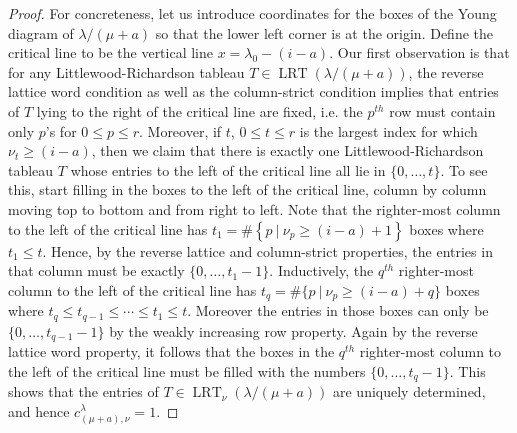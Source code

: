 \documentclass[unnumsec,webpdf,modern,medium]{oup-authoring-template}
\theoremstyle{theorem}
\theoremstyle{definition}
\begin{document}
\begin{proof}
	For concreteness, let us introduce coordinates for the boxes of the Young diagram of $\lambda/(\mu+a)$ so that the lower left corner is at the origin.  Define the critical line to be the vertical line $x=\lambda_0-(i-a)$.  Our first observation is that for any Littlewood-Richardson tableau $T\in\operatorname{LRT}(\lambda/(\mu+a))$, the reverse lattice word condition as well as the column-strict condition implies that entries of $T$ lying to the right of the critical line are fixed, i.e. the $p^{th}$ row must contain only $p$'s for $0\leq p\leq r$.  Moreover, if $t$, $0\leq t\leq r$ is the largest index for which $\nu_t\geq (i-a)$, then we claim that there is exactly one Littlewood-Richardson tableau $T$ whose entries to the left of the critical line all lie in $\{0,\ldots,t\}$.  To see this, start filling in the boxes to the left of the critical line, column by column moving top to bottom and from right to left.  Note that the righter-most column to the left of the critical line has $t_1=\#\left\{p \ | \ \nu_p\geq (i-a)+1\right\}$ boxes where $t_1\leq t$.  Hence, by the reverse lattice and column-strict properties, the entries in that column must be exactly $\{0,\ldots,t_1-1\}$.  Inductively, the $q^{th}$ righter-most column to the left of the critical line has $t_q=\#\{p \ | \ \nu_p\geq (i-a)+q\}$ boxes where $t_q\leq t_{q-1}\leq \cdots\leq t_1\leq t$.  Moreover the entries in those boxes can only be $\{0,\ldots,t_{q-1}-1\}$ by the weakly increasing row property.  Again by the reverse lattice word property, it follows that the boxes in the $q^{th}$ righter-most column to the left of the critical line must be filled with the numbers $\{0,\ldots,t_q-1\}$.  This shows that the entries of $T\in\operatorname{LRT}_\nu(\lambda/(\mu+a))$ are uniquely determined, and hence $c^\lambda_{(\mu+a),\nu}=1$.
	

\end{proof}
\end{document}
